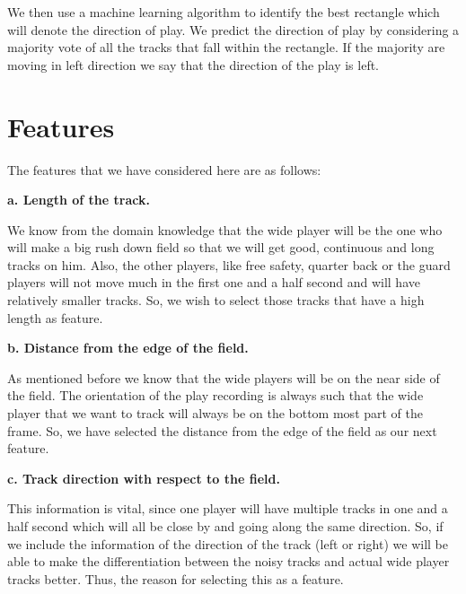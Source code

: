 \documentclass{article} %
\begin{document}
We then use a machine learning algorithm to identify the best rectangle which will denote the direction of play. We predict the direction of play by considering a majority vote of all the tracks that fall within the rectangle. If the majority are moving in left direction we say that the direction of the play is left.

\section{Features}

The features that we have considered here are as follows:

\textbf{a. Length of the track.}

We know from the domain knowledge that the wide player will be the one who will make a big rush down field so that we will get good, continuous and long tracks on him. Also, the other players, like free safety, quarter back or the guard players will not move much in the first one and a half second and will have relatively smaller tracks. So, we wish to select those tracks that have a high length as feature.

\textbf{b. Distance from the edge of the field.}

As mentioned before we know that the wide players will be on the near side of the field. The orientation of the play recording is always such that the wide player that we want to track will always be on the bottom most part of the frame. So, we have selected the distance from the edge of the field as our next feature. 

\textbf{c. Track direction with respect to the field.}

This information is vital, since one player will have multiple tracks in one and a half second which will all be close by and going along the same direction. So, if we include the information of the direction of the track (left or right) we will be able to make the differentiation between the noisy tracks and actual wide player tracks better. Thus, the reason for selecting this as a feature.
\end{document}
